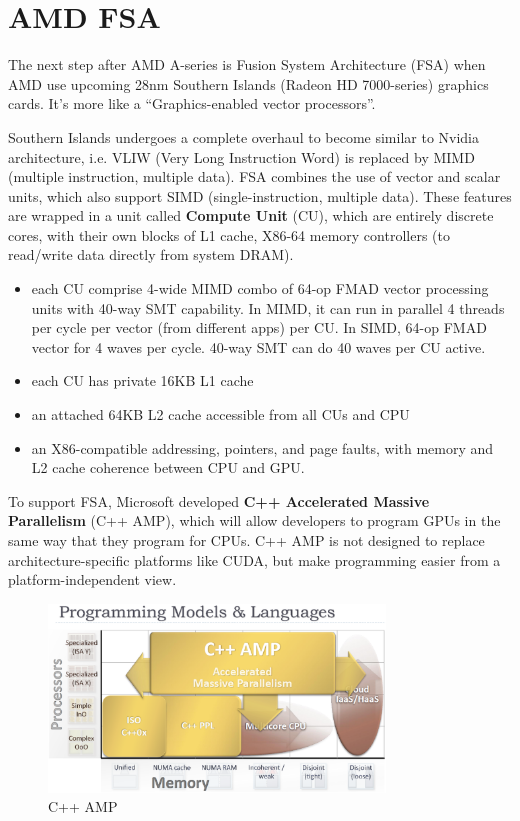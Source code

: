\section{AMD FSA}
\label{sec:amd-fsa}

The next step after AMD A-series is Fusion System Architecture (FSA)
when AMD use upcoming 28nm Southern Islands (Radeon HD 7000-series)
graphics cards. It's more like a ``Graphics-enabled vector
processors''.

Southern Islands undergoes a complete overhaul to become similar to
Nvidia architecture, i.e.  VLIW (Very Long Instruction Word) is
replaced by MIMD (multiple instruction, multiple data). FSA combines
the use of vector and scalar units, which also support SIMD
(single-instruction, multiple data). These features are wrapped in a
unit called {\bf Compute Unit} (CU), which are entirely discrete
cores, with their own blocks of L1 cache, X86-64 memory controllers
(to read/write data directly from system DRAM).
\begin{itemize}
\item each CU comprise 4-wide MIMD combo of 64-op FMAD vector
  processing units with 40-way SMT capability. In MIMD, it can run in
  parallel 4 threads per cycle per vector (from different apps) per
  CU. In SIMD, 64-op FMAD vector for 4 waves per cycle. 40-way SMT can
  do 40 waves per CU active. 

\item each CU has private 16KB L1 cache
\item an attached 64KB L2 cache accessible from all CUs and CPU
\item an X86-compatible addressing, pointers, and page faults, with
  memory and L2 cache coherence between CPU and GPU. 
\end{itemize}

To support FSA, Microsoft developed
{\bf C++ Accelerated Massive Parallelism} (C++ AMP), which will allow
developers to program GPUs in the same way that they program for
CPUs. C++ AMP is not designed to replace architecture-specific
platforms like CUDA, but make programming easier from a
platform-independent view. 

\begin{figure}[hbt]
  \centerline{\includegraphics[height=5cm,
    angle=0]{./images/C++_AMP.eps}}
\caption{C++ AMP}
\label{fig:C++AMP}
\end{figure}


